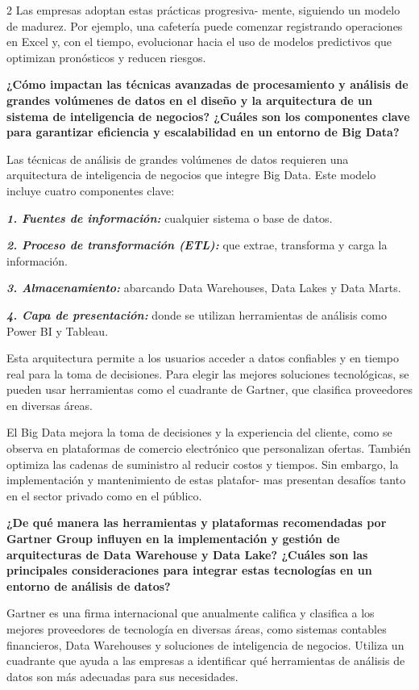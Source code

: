 \documentclass[12pt,spanish,Letterpaper,openany]{book}
\begin{document}
\begin {multicols}{2}
Las empresas adoptan estas prácticas progresiva-
mente, siguiendo un modelo de madurez. Por ejemplo, una cafetería puede comenzar registrando operaciones en Excel y, con el tiempo, evolucionar hacia el uso de modelos predictivos que optimizan pronósticos y reducen riesgos.

\textbf{¿Cómo impactan las técnicas avanzadas de procesamiento y análisis de grandes volúmenes de datos en el diseño y la arquitectura de un sistema de inteligencia de negocios? ¿Cuáles son los componentes clave para garantizar eficiencia y escalabilidad en un entorno de Big Data?}

Las técnicas de análisis de grandes volúmenes de datos requieren una arquitectura de inteligencia de negocios que integre Big Data. Este modelo incluye cuatro componentes clave:

\textbf{\emph{1. Fuentes de información:}} cualquier sistema o base de datos.

\textbf{\emph{2. Proceso de transformación (ETL):}} que extrae, transforma y carga la información.

\textbf{\emph{3. Almacenamiento:}} abarcando Data Warehouses, Data Lakes y Data Marts.

\textbf{\emph{4. Capa de presentación:}} donde se utilizan herramientas de análisis como Power BI y Tableau.

Esta arquitectura permite a los usuarios acceder a datos confiables y en tiempo real para la toma de decisiones. Para elegir las mejores soluciones tecnológicas, se pueden usar herramientas como el cuadrante de Gartner, que clasifica proveedores en diversas áreas.

El Big Data mejora la toma de decisiones y la experiencia del cliente, como se observa en plataformas de comercio electrónico que personalizan ofertas. También optimiza las cadenas de suministro al reducir costos y tiempos. Sin embargo, la implementación y mantenimiento de estas platafor-
mas presentan desafíos tanto en el sector privado como en el público.

\textbf{¿De qué manera las herramientas y plataformas recomendadas por Gartner Group influyen en la implementación y gestión de arquitecturas de Data Warehouse y Data Lake? ¿Cuáles son las principales consideraciones para integrar estas tecnologías en un entorno de análisis de datos?}

Gartner es una firma internacional que anualmente califica y clasifica a los mejores proveedores de tecnología en diversas áreas, como sistemas contables financieros, Data Warehouses y soluciones de inteligencia de negocios. Utiliza un cuadrante que ayuda a las empresas a identificar qué herramientas de análisis de datos son más adecuadas para sus necesidades.


\end{multicols}
\end{document}
